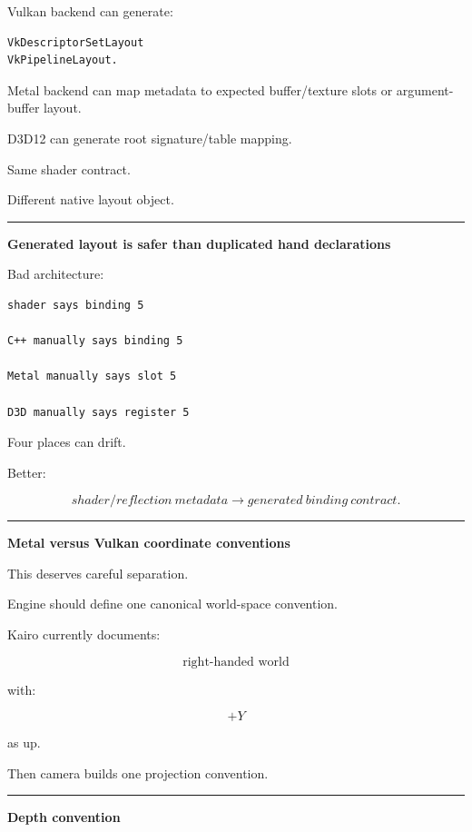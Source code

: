 Vulkan backend can generate:

\begin{verbatim}
VkDescriptorSetLayout
VkPipelineLayout.
\end{verbatim}

Metal backend can map metadata to expected buffer/texture slots or argument-buffer layout.

D3D12 can generate root signature/table mapping.

Same shader contract.

Different native layout object.

\begin{center}\rule{0.5\linewidth}{0.5pt}\end{center}

\textbf{Generated layout is safer than duplicated hand declarations}

Bad architecture:

\begin{verbatim}
shader says binding 5

C++ manually says binding 5

Metal manually says slot 5

D3D manually says register 5
\end{verbatim}

Four places can drift.

Better:

\[
shader/reflection\ metadata
\rightarrow
generated\ binding\ contract.
\]

\begin{center}\rule{0.5\linewidth}{0.5pt}\end{center}

\textbf{Metal versus Vulkan coordinate conventions}

This deserves careful separation.

Engine should define one canonical world-space convention.

Kairo currently documents:

\[
\boxed{
\text{right-handed world}
}
\]

with:

\[
+Y
\]

as up.

Then camera builds one projection convention.

\begin{center}\rule{0.5\linewidth}{0.5pt}\end{center}

\textbf{Depth convention}

